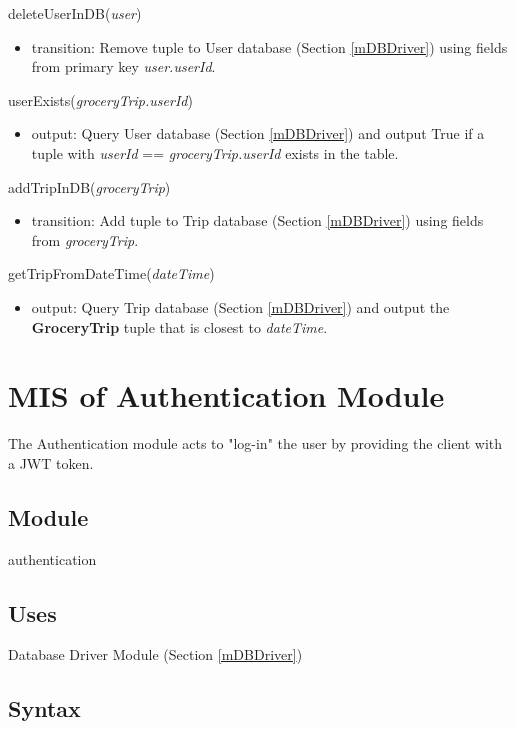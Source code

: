 \documentclass[12pt, titlepage]{article}
\begin{document}
\noindent deleteUserInDB(\textit{user})
\begin{itemize}
\item transition: Remove tuple to User database (Section \ref{mDBDriver}) using fields from primary key \textit{user.userId}.
\end{itemize}

\noindent userExists(\textit{groceryTrip.userId})
\begin{itemize}
\item output: Query User database (Section \ref{mDBDriver}) and output True if a tuple with \textit{userId} == \textit{groceryTrip.userId} exists in the table.
\end{itemize}

\noindent addTripInDB(\textit{groceryTrip})
\begin{itemize}
\item transition: Add tuple to Trip database (Section \ref{mDBDriver}) using fields from \textit{groceryTrip}.
\end{itemize}

\noindent getTripFromDateTime(\textit{dateTime})
\begin{itemize}
\item output: Query Trip database (Section \ref{mDBDriver}) and output the \textbf{GroceryTrip} tuple that is closest to \textit{dateTime}.
\end{itemize}

\newpage

\section{MIS of Authentication Module} \label{mAuthentication} 
The Authentication module acts to "log-in" the user by providing the client with a JWT token.

\subsection{Module}

authentication

\subsection{Uses}

Database Driver Module (Section \ref{mDBDriver}) 

\subsection{Syntax}
\end{document}
